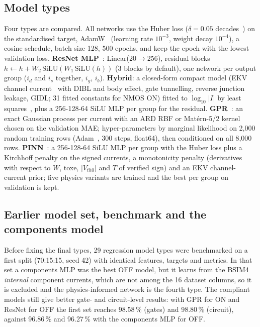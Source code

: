 \subsection{Model types}\label{sec:models:types}
Four types are compared. All networks use the Huber loss ($\delta=0.05$ decades~\cite{huber}) on the standardised target, AdamW~\cite{adamw} (learning rate $10^{-3}$, weight decay $10^{-4}$), a cosine schedule, batch size 128, 500 epochs, and keep the epoch with the lowest validation loss.
\textbf{ResNet MLP}~\cite{resnet}: Linear(20$\rightarrow$256), residual blocks $h\leftarrow h+W_2\,\mathrm{SiLU}(W_1\,\mathrm{SiLU}(h))$ (3 blocks by default), one network per output group ($i_d$ and $i_s$ together, $i_g$, $i_b$).
\textbf{Hybrid}: a closed-form compact model (EKV channel current~\cite{ekv} with DIBL and body effect, gate tunnelling, reverse junction leakage, GIDL; 31 fitted constants for NMOS ON) fitted to $\log_{10}|I|$ by least squares~\cite{scipy}, plus a 256-128-64 SiLU MLP per group for the residual.
\textbf{GPR}~\cite{rasmussen}: an exact Gaussian process per current with an ARD RBF or Mat\'ern-5/2 kernel chosen on the validation MAE; hyper-parameters by marginal likelihood on 2,000 random training rows (Adam~\cite{adam}, 300 steps, float64), then conditioned on all 8,000 rows.
\textbf{PINN}~\cite{pinn}: a 256-128-64 SiLU MLP per group with the Huber loss plus a Kirchhoff penalty on the signed currents, a monotonicity penalty (derivatives with respect to $W$, toxe, $|V_{th0}|$ and $T$ of verified sign) and an EKV channel-current prior; five physics variants are trained and the best per group on validation is kept.

\ifexpFirstModels
\subsection{Earlier model set, benchmark and the components model}\label{sec:models:first}
Before fixing the final types, 29 regression model types were benchmarked on a first split (70:15:15, seed 42) with identical features, targets and metrics.
In that set a components MLP was the best OFF model, but it learns from the BSIM4 \emph{internal} component currents, which are not among the 16 dataset columns, so it is excluded and the physics-informed network is the fourth type.
The compliant models still give better gate- and circuit-level results: with GPR for ON and ResNet for OFF the first set reaches 98.58\,\% (gates) and 98.80\,\% (circuit), against 96.86\,\% and 96.27\,\% with the components MLP for OFF.
\fi

